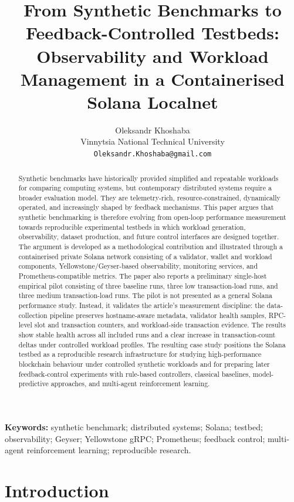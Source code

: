 \documentclass[11pt,a4paper]{article}
\title{From Synthetic Benchmarks to Feedback-Controlled Testbeds: Observability and Workload Management in a Containerised Solana Localnet}
\author{Oleksandr Khoshaba\\
\small Vinnytsia National Technical University\\
\small \texttt{Oleksandr.Khoshaba@gmail.com}}
\begin{document}
\maketitle

\begin{abstract}
Synthetic benchmarks have historically provided simplified and repeatable workloads for comparing computing systems, but contemporary distributed systems require a broader evaluation model. They are telemetry-rich, resource-constrained, dynamically operated, and increasingly shaped by feedback mechanisms. This paper argues that synthetic benchmarking is therefore evolving from open-loop performance measurement towards reproducible experimental testbeds in which workload generation, observability, dataset production, and future control interfaces are designed together. The argument is developed as a methodological contribution and illustrated through a containerised private Solana network consisting of a validator, wallet and workload components, Yellowstone/Geyser-based observability, monitoring services, and Prometheus-compatible metrics. The paper also reports a preliminary single-host empirical pilot consisting of three baseline runs, three low transaction-load runs, and three medium transaction-load runs. The pilot is not presented as a general Solana performance study. Instead, it validates the article's measurement discipline: the data-collection pipeline preserves hostname-aware metadata, validator health samples, RPC-level slot and transaction counters, and workload-side transaction evidence. The results show stable health across all included runs and a clear increase in transaction-count deltas under controlled workload profiles. The resulting case study positions the Solana testbed as a reproducible research infrastructure for studying high-performance blockchain behaviour under controlled synthetic workloads and for preparing later feedback-control experiments with rule-based controllers, classical baselines, model-predictive approaches, and multi-agent reinforcement learning.
\end{abstract}

\noindent\textbf{Keywords:} synthetic benchmark; distributed systems; Solana; testbed; observability; Geyser; Yellowstone gRPC; Prometheus; feedback control; multi-agent reinforcement learning; reproducible research.

\section{Introduction}
\label{sec:introduction}
\end{document}
